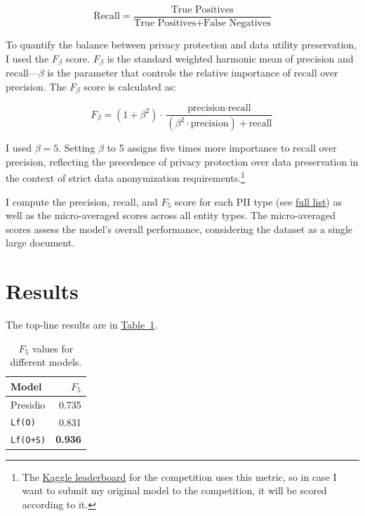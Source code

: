 \documentclass[11pt]{article}
\newcommand{\Tablink}[1]{\hyperref[#1]{Table~\ref*{#1}}}
\begin{document}
\begin{equation*}
\text{Recall} = \frac{\text{True Positives}}{\text{True Positives} + \text{False Negatives}}
\end{equation*}

To quantify the balance between privacy protection and data utility preservation, I used the $F_\beta$ score. $F_\beta$ is the standard weighted harmonic mean of precision and recall—$\beta$ is the parameter that controls the relative importance of recall over precision. The $F_\beta$ score is calculated as:

\begin{equation*}
F_\beta = (1 + \beta^2) \cdot \frac{\text{precision} \cdot \text{recall}}{(\beta^2 \cdot \text{precision}) + \text{recall}}
\end{equation*}
 
I used $\beta=5$. Setting $\beta$ to 5 assigns five times more importance to recall over precision, reflecting the precedence of privacy protection over data preservation in the context of strict data anonymization requirements.\footnote{The \href{https://www.kaggle.com/competitions/pii-detection-removal-from-educational-data/leaderboard}{Kaggle leaderboard} for the competition uses this metric, so in case I want to submit my original model to the competition, it will be scored according to it.} 

I compute the precision, recall, and $F_5$ score for each PII type (see \hyperref[par:pii_types]{full list}) as well as the micro-averaged scores across all entity types. The micro-averaged scores assess the model's overall performance, considering the dataset as a single large document.

\section{Results} 

The top-line results are in \Tablink{tab:f5_values}.

\begin{table}[h!]
  \centering
  \caption{$F_5$ values for different models.}
  \label{tab:f5_values}
  \begin{tabular}{lr}
  \toprule
  \textbf{Model} & \textbf{$F_5$} \\
  \midrule
  Presidio & 0.735 \\
  \texttt{Lf(O)} & 0.831 \\
  \texttt{Lf(O+S)} & \textbf{0.936} \\
  \bottomrule
  \end{tabular}
\end{table}
\end{document}
